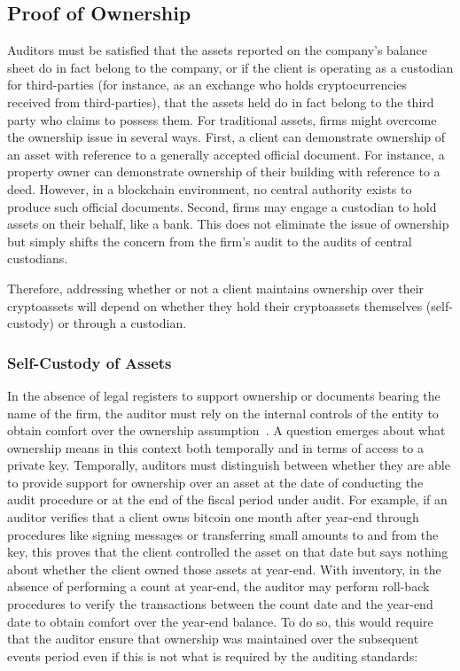 \subsection{Proof of Ownership}\label{sec:auditing:framework:ownership}

Auditors must be satisfied that the assets reported on the company's balance sheet do in fact belong to the company, or if the client is operating as a custodian for third-parties (for instance, as an exchange who holds cryptocurrencies received from third-parties), that the assets held do in fact belong to the third party who claims to possess them. For traditional assets, firms might overcome the ownership issue in several ways. First, a client can demonstrate ownership of an asset with reference to a generally accepted official document. For instance, a property owner can demonstrate ownership of their building with reference to a deed. However, in a blockchain environment, no central authority exists to produce such official documents. Second, firms may engage a custodian to hold assets on their behalf, like a bank. This does not eliminate the issue of ownership but simply shifts the concern from the firm's audit to the audits of central custodians.

Therefore, addressing whether or not a client maintains ownership over their cryptoassets will depend on whether they hold their cryptoassets themselves (self-custody) or through a custodian.


\subsubsection{Self-Custody of Assets}
In the absence of legal registers to support ownership or documents bearing the name of the firm, the auditor must rely on the internal controls of the entity to obtain comfort over the ownership assumption~\cite{pimentel2021systemizing}. A question emerges about what ownership means in this context both temporally and in terms of access to a private key. Temporally, auditors must distinguish between whether they are able to provide support for ownership over an asset at the date of conducting the audit procedure or at the end of the fiscal period under audit. For example, if an auditor verifies that a client owns bitcoin one month after year-end through procedures like signing messages or transferring small amounts to and from the key, this proves that the client controlled the asset on that date but says nothing about whether the client owned those assets at year-end. With inventory, in the absence of performing a count at year-end, the auditor may perform roll-back procedures to verify the transactions between the count date and the year-end date to obtain comfort over the year-end balance. To do so, this would require that the auditor ensure that ownership was maintained over the subsequent events period even if this is not what is required by the auditing standards: 

